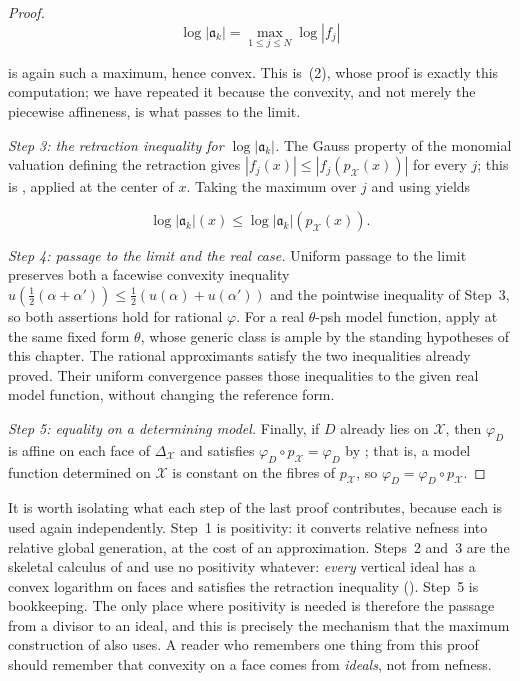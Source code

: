 \begin{proof}
\[
       \log|\mathfrak a_k|
       =\max_{1\leq j\leq N}\log|f_j|
\]

is again such a maximum, hence convex.  This is
\,(2), whose proof is exactly this
computation; we have repeated it because the convexity, and not merely the
piecewise affineness, is what passes to the limit.

\emph{Step 3: the retraction inequality for $\log|\mathfrak a_k|$.}  The
Gauss property of the monomial valuation defining the retraction gives
$|f_j(x)|\leq|f_j(p_{\mathcal X}(x))|$ for every $j$; this is
, applied at the center of $x$.  Taking the
maximum over $j$ and using
 yields

\[
 \log|\mathfrak a_k|(x)
 \leq\log|\mathfrak a_k|(p_{\mathcal X}(x)).
\]

\emph{Step 4: passage to the limit and the real case.}  Uniform passage to
the limit preserves both a facewise convexity inequality
$u(\tfrac12(\alpha+\alpha'))\leq\tfrac12(u(\alpha)+u(\alpha'))$ and the
pointwise inequality of Step~3, so both assertions hold for rational
$\varphi$.  For a real $\theta$-psh model function, apply
 at the same fixed form
$\theta$, whose generic class is ample by the standing hypotheses of
this chapter.  The rational approximants satisfy the two inequalities
already proved.  Their uniform convergence passes those inequalities to
the given real model function, without changing the reference form.

\emph{Step 5: equality on a determining model.}  Finally, if
$D$ already lies on $\mathcal X$, then $\varphi_D$ is affine on each
face of $\Delta_{\mathcal X}$ and satisfies
$\varphi_D\circ p_{\mathcal X}=\varphi_D$ by
; that is, a model function determined on
$\mathcal X$ is constant on the fibres of $p_{\mathcal X}$, so
$\varphi_D=\varphi_D\circ p_{\mathcal X}$.
\end{proof}

\begin{remark}
\label{rem:ch21-lemma-ingredients}
It is worth isolating what each step of the last proof contributes, because
each is used again independently.  Step~1 is positivity: it converts
relative nefness into relative global generation, at the cost of an
approximation.  Steps~2 and~3 are the skeletal calculus of
 and use no positivity whatever: \emph{every} vertical
ideal has a convex logarithm on faces and satisfies the retraction
inequality ().  Step~5 is bookkeeping.  The
only place where positivity is needed is therefore the passage from a
divisor to an ideal, and this is precisely the mechanism that the maximum
construction of  also uses.  A reader who
remembers one thing from this proof should remember that convexity on a face
comes from \emph{ideals}, not from nefness.
\end{remark}

